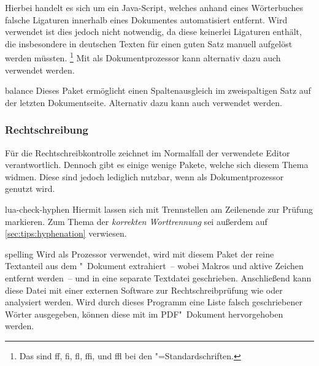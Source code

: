 \begin{packages}
  Hierbei handelt es sich um ein Java-Script, welches anhand eines Wörterbuches 
  falsche Ligaturen innerhalb eines Dokumentes automatisiert entfernt. Wird 
  \Univers verwendet ist dies jedoch nicht notwendig, da diese keinerlei 
  Ligaturen enthält, die insbesondere in deutschen Texten für einen guten Satz 
  manuell aufgelöst werden müssten.%
  \footnote{%
    Das sind ff, fi, fl, ffi, und ffl bei den "=Standardschriften.
  }
  Mit  als Dokumentprozessor kann alternativ dazu auch 
   verwendet werden.
\item[balance]%
  Dieses Paket ermöglicht einen Spaltenausgleich im zweispaltigen Satz auf der 
  letzten Dokumentseite. Alternativ dazu kann auch  verwendet 
  werden.
%
\end{packages}

\subsubsection{Rechtschreibung}
%
%
Für die Rechtschreibkontrolle zeichnet im Normalfall der verwendete Editor 
verantwortlich. Dennoch gibt es einige wenige Pakete, welche sich diesem Thema 
widmen. Diese sind jedoch lediglich nutzbar, wenn  als 
Dokumentprozessor genutzt wird.
\begin{packages}
\item[lua-check-hyphen]%
  Hiermit lassen sich mit  Trennstellen am Zeilenende zur 
  Prüfung markieren. Zum Thema der \textit{korrekten Worttrennung} sei außerdem 
  auf \autoref{sec:tips:hyphenation} verwiesen.
\item[spelling]
  Wird  als Prozessor verwendet, wird mit diesem Paket der 
  reine Textanteil aus dem "~Dokument extrahiert~-- wobei Makros 
  und aktive Zeichen entfernt werden~-- und in eine separate Textdatei 
  geschrieben. Anschließend kann diese Datei mit einer externen Software zur 
  Rechtschreibprüfung wie  oder  
  analysiert werden. Wird durch dieses Programm eine Liste falsch geschriebener 
  Wörter ausgegeben, können diese mit  im PDF"~Dokument 
  hervorgehoben werden.
%
\end{packages}

